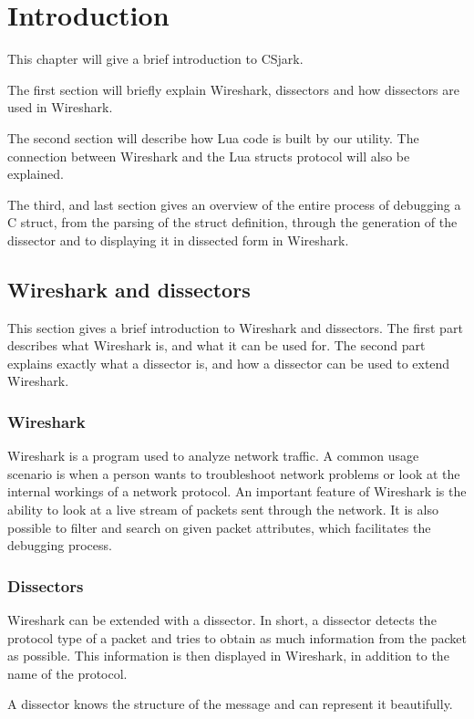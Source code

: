 \chapter{Introduction}

This chapter will give a brief introduction to CSjark.

The first section will briefly explain Wireshark, dissectors and how dissectors are used in Wireshark.

The second section will describe how Lua code is built by our utility. 
The connection between Wireshark and the Lua structs protocol will also be explained.

The third, and last section gives an overview of the entire process of debugging a C struct, from the parsing of the struct definition, through the
generation of the dissector and to displaying it in dissected form in Wireshark.

\section{Wireshark and dissectors}
This section gives a brief introduction to Wireshark and dissectors.
The first part describes what Wireshark is, and what it can be used for.
The second part explains exactly what a dissector is, and how a dissector can be used to extend Wireshark.

\subsection{Wireshark}
Wireshark is a program used to analyze network traffic. A common usage scenario is when a person wants to troubleshoot network problems or
look at the internal workings of a network protocol. An important feature of Wireshark is the ability to look at a live stream of packets sent through the network.
It is also possible to filter and search on given packet attributes, which facilitates the debugging process.

\subsection{Dissectors}
Wireshark can be extended with a dissector. In short, a dissector detects the protocol type of a packet and tries to obtain as much information
from the packet as possible. This information is then displayed in Wireshark, in addition to the name of the protocol.


 A dissector knows the structure of the message and can represent it beautifully.

